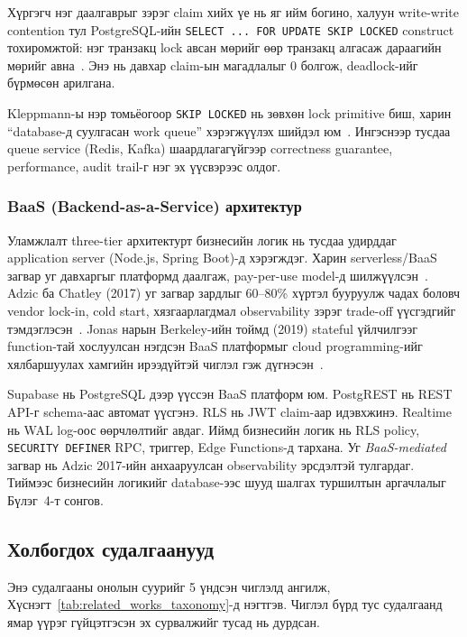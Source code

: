 Хүргэгч нэг даалгаврыг зэрэг claim хийх үе нь яг ийм богино, халуун write-write contention тул PostgreSQL-ийн \texttt{SELECT ... FOR UPDATE SKIP LOCKED} construct тохиромжтой: нэг транзакц lock авсан мөрийг өөр транзакц алгасаж дараагийн мөрийг авна~\cite{postgresql2024locking}. Энэ нь давхар claim-ын магадлалыг 0 болгож, deadlock-ийг бүрмөсөн арилгана.

Kleppmann-ы нэр томьёогоор \texttt{SKIP LOCKED} нь зөвхөн lock primitive биш, харин ``database-д суулгасан work queue'' хэрэгжүүлэх шийдэл юм~\cite{kleppmann2017ddia}. Ингэснээр тусдаа queue service (Redis, Kafka) шаардлагагүйгээр correctness guarantee, performance, audit trail-г нэг эх үүсвэрээс олдог.

\subsubsection{BaaS (Backend-as-a-Service) архитектур}
\label{subsubsec:baas_theory}

Уламжлалт three-tier архитектурт бизнесийн логик нь тусдаа удирддаг application server (Node.js, Spring Boot)-д хэрэгждэг. Харин serverless/BaaS загвар уг давхаргыг платформд даалгаж, pay-per-use model-д шилжүүлсэн~\cite{baldini2017serverless}. Adzic ба Chatley (2017) уг загвар зардлыг 60--80\% хүртэл бууруулж чадах боловч vendor lock-in, cold start, хязгаарлагдмал observability зэрэг trade-off үүсгэдгийг тэмдэглэсэн~\cite{adzic2017serverless}. Jonas нарын Berkeley-ийн тоймд (2019) stateful үйлчилгээг function-тай хослуулсан нэгдсэн BaaS платформыг cloud programming-ийг хялбаршуулах хамгийн ирээдүйтэй чиглэл гэж дүгнэсэн~\cite{jonas2019berkeleyserverless}.

Supabase нь PostgreSQL дээр үүссэн BaaS платформ юм. PostgREST нь REST API-г schema-аас автомат үүсгэнэ. RLS нь JWT claim-аар идэвхжинэ. Realtime нь WAL log-оос өөрчлөлтийг авдаг. Иймд бизнесийн логик нь RLS policy, \texttt{SECURITY DEFINER} RPC, триггер, Edge Functions-д тархана. Уг \emph{BaaS-mediated} загвар нь Adzic 2017-ийн анхааруулсан observability эрсдэлтэй тулгардаг. Тиймээс бизнесийн логикийг database-ээс шууд шалгах туршилтын аргачлалыг Бүлэг~4-т сонгов.

\subsection{Холбогдох судалгаанууд}
\label{subsec:related_works}

Энэ судалгааны онолын суурийг 5 үндсэн чиглэлд ангилж, Хүснэгт~\ref{tab:related_works_taxonomy}-д нэгтгэв. Чиглэл бүрд тус судалгаанд ямар үүрэг гүйцэтгэсэн эх сурвалжийг тусад нь дурдсан.

